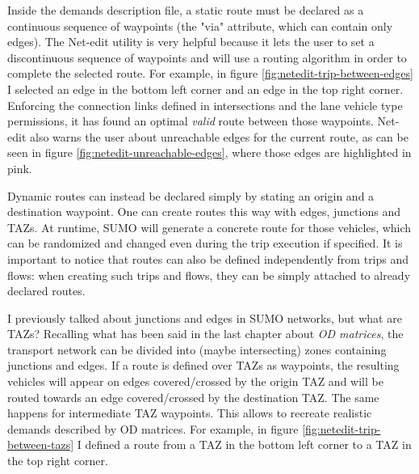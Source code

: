 Inside the demands description file, a static route must be declared as a continuous sequence of waypoints (the "via" attribute, which can contain only edges). The Net-edit utility is very helpful because it lets the user to set a discontinuous sequence of waypoints and will use a routing algorithm in order to complete the selected route. For example, in figure \ref{fig:netedit-trip-between-edges} I selected an edge in the bottom left corner and an edge in the top right corner. Enforcing the connection links defined in intersections and the lane vehicle type permissions, it has found an optimal \textit{valid} route between those waypoints. Net-edit also warns the user about unreachable edges for the current route, as can be seen in figure \ref{fig:netedit-unreachable-edges}, where those edges are highlighted in pink.


Dynamic routes can instead be declared simply by stating an origin and a destination waypoint. One can create routes this way with edges, junctions and TAZs. At runtime, SUMO will generate a concrete route for those vehicles, which can be randomized and changed even during the trip execution if specified. It is important to notice that routes can also be defined independently from trips and flows: when creating such trips and flows, they can be simply attached to already declared routes.

I previously talked about junctions and edges in SUMO networks, but what are TAZs? Recalling what has been said in the last chapter about \textit{OD matrices}, the transport network can be divided into (maybe intersecting) zones containing junctions and edges. If a route is defined over TAZs as waypoints, the resulting vehicles will appear on edges covered/crossed by the origin TAZ and will be routed towards an edge covered/crossed by the destination TAZ. The same happens for intermediate TAZ waypoints. This allows to recreate realistic demands described by OD matrices. For example, in figure \ref{fig:netedit-trip-between-tazs} I defined a route from a TAZ in the bottom left corner to a TAZ in the top right corner.


